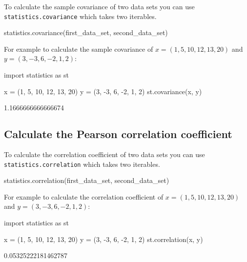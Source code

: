 To calculate the sample covariance of two data sets you can use
\texttt{statistics.covariance} which takes two iterables.


\begin{api}
statistics.covariance(first_data_set, second_data_set)
\end{api}



For example to calculate the sample covariance of \(x=(1, 5, 10, 12, 13, 20)\)
and \(y=(3, -3, 6, -2, 1, 2)\):




\begin{pyin}
import statistics as st

x = (1, 5, 10, 12, 13, 20)
y = (3, -3, 6, -2, 1, 2)
st.covariance(x, y)
\end{pyin}





\begin{raw}
1.1666666666666674
\end{raw}





\subsection{Calculate the Pearson correlation coefficient}
\label{\detokenize{tools-for-mathematics/08-statistics/how/main:calculate-the-pearson-correlation-coefficient}}

To calculate the correlation coefficient of two data sets you can use
\texttt{statistics.correlation} which takes two iterables.


\begin{api}
statistics.correlation(first_data_set, second_data_set)
\end{api}



For example to calculate the correlation coefficient of \(x=(1, 5, 10, 12, 13, 20)\)
and \(y=(3, -3, 6, -2, 1, 2)\):




\begin{pyin}
import statistics as st

x = (1, 5, 10, 12, 13, 20)
y = (3, -3, 6, -2, 1, 2)
st.correlation(x, y)
\end{pyin}





\begin{raw}
0.05325222181462787
\end{raw}






